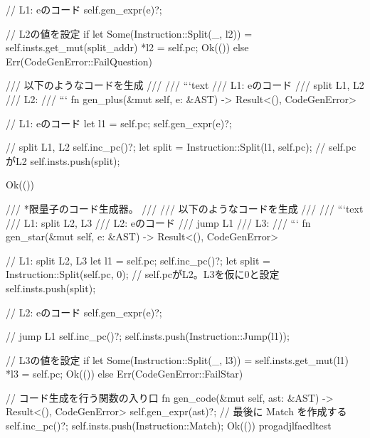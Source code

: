 {{        // L1: eのコード
        self.gen_expr(e)?;

        // L2の値を設定
        if let Some(Instruction::Split(_, l2)) = self.insts.get_mut(split_addr) {
            *l2 = self.pc;
            Ok(())
        } else {
            Err(CodeGenError::FailQuestion)
        }
    }

    /// 以下のようなコードを生成
    ///
    /// ```text
    /// L1: eのコード
    ///     split L1, L2
    /// L2:
    /// ```
    fn gen_plus(&mut self, e: &AST) -> Result<(), CodeGenError> {
        // L1: eのコード
        let l1 = self.pc;
        self.gen_expr(e)?;

        // split L1, L2
        self.inc_pc()?;
        let split = Instruction::Split(l1, self.pc); // self.pcがL2
        self.insts.push(split);

        Ok(())
    }

    /// *限量子のコード生成器。
    ///
    /// 以下のようなコードを生成
    ///
    /// ```text
    /// L1: split L2, L3
    /// L2: eのコード
    ///     jump L1
    /// L3:
    /// ```
    fn gen_star(&mut self, e: &AST) -> Result<(), CodeGenError> {
        // L1: split L2, L3
        let l1 = self.pc;
        self.inc_pc()?;
        let split = Instruction::Split(self.pc, 0); // self.pcがL2。L3を仮に0と設定
        self.insts.push(split);

        // L2: eのコード
        self.gen_expr(e)?;

        // jump L1
        self.inc_pc()?;
        self.insts.push(Instruction::Jump(l1));

        // L3の値を設定
        if let Some(Instruction::Split(_, l3)) = self.insts.get_mut(l1) {
            *l3 = self.pc;
            Ok(())
        } else {
            Err(CodeGenError::FailStar)
        }
    }

    // コード生成を行う関数の入り口
    fn gen_code(&mut self, ast: &AST) -> Result<(), CodeGenError> {
        self.gen_expr(ast)?;
        // 最後に Match を作成する
        self.inc_pc()?;
        self.insts.push(Instruction::Match);
        Ok(())
    }
    progadjlfaedltest
}

